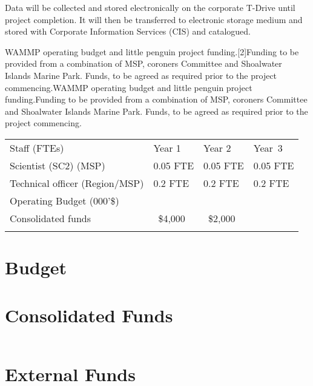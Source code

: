 \documentclass[version=last,
    paper=a4,                               %
    10pt,                                   %
    dvipsnames,
    oneside,                              %
    headings=openany,                       %
    open=any,
    BCOR=7mm,                               %
    DIV=15,     %
]{scrbook}
\begin{document}
Data will be collected and stored electronically on the corporate
T-Drive until project completion. It will then be transferred to
electronic storage medium and stored with Corporate Information Services
(CIS) and catalogued.

WAMMP operating budget and little penguin project funding.{[}2{]}Funding
to be provided from a combination of MSP, coroners Committee and
Shoalwater Islands Marine Park. Funds, to be agreed as required prior to
the project commencing.WAMMP operating budget and little penguin project
funding.Funding to be provided from a combination of MSP, coroners
Committee and Shoalwater Islands Marine Park. Funds, to be agreed as
required prior to the project commencing.

\begin{longtable}[c]{@{}llll@{}}
\toprule\addlinespace
Staff (FTEs) & Year 1 & Year 2 & Year~3
\\\addlinespace
Scientist (SC2) (MSP) & 0.05 FTE & 0.05 FTE & 0.05 FTE
\\\addlinespace
Technical officer (Region/MSP) & 0.2 FTE & 0.2 FTE & 0.2 FTE
\\\addlinespace
Operating Budget (000'\$) & ~ & ~ & ~
\\\addlinespace
Consolidated funds & ~\$4,000 & ~\$2,000 & ~
\\\addlinespace
\bottomrule
\end{longtable}




\section*{Budget}

\section*{Consolidated Funds }



\begin{longtabu} to \linewidth { |  X | }
\hline
{}
\\
\hline
\endhead


\hline
\end{longtabu}



\section*{External Funds }



\begin{longtabu} to \linewidth { |  X | }
\hline
{}
\\
\hline
\endhead


\hline
\end{longtabu}





\end{document}
